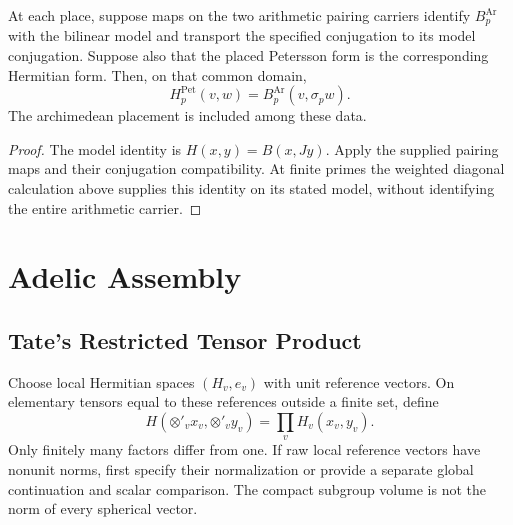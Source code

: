 \begin{corollary}
\label{v4-arith:kp:cor:local-compatibility}
At each place, suppose maps on the two arithmetic pairing carriers
identify \(B_p^{\mathrm{Ar}}\) with the bilinear model and transport
the specified conjugation to its model conjugation. Suppose also
that the placed Petersson form is the corresponding Hermitian form.
Then, on that common domain,
\begin{equation}
\label{v4-arith:kp:eq:local-compatibility}
 H_p^{\mathrm{Pet}}(v,w)=B_p^{\mathrm{Ar}}(v,\sigma_p w).
\end{equation}
The archimedean placement is included among these data.
\end{corollary}
\begin{proof}
The model identity is \(H(x,y)=B(x,Jy)\). Apply the supplied
pairing maps and their conjugation compatibility. At finite primes
the weighted diagonal calculation above supplies this identity on
its stated model, without identifying the entire arithmetic carrier.
\end{proof}

\section{Adelic Assembly}
\label{v4-arith:kp:adelic}

\subsection{Tate's Restricted Tensor Product}
\label{v4-arith:kp:adelic:restricted-tensor}

\begin{definition}
\label{v4-arith:kp:def:adelic-pairing}
Choose local Hermitian spaces \((H_v,e_v)\) with unit reference
vectors. On elementary tensors equal to these references outside a
finite set, define
\begin{equation}
\label{v4-arith:kp:eq:adelic-restricted-tensor}
 H(\otimes'_v x_v,\otimes'_v y_v)=\prod_v H_v(x_v,y_v).
\end{equation}
Only finitely many factors differ from one. If raw local reference
vectors have nonunit norms, first specify their normalization or
provide a separate global continuation and scalar comparison.
The compact subgroup volume is not the norm of every spherical
vector.
\end{definition}

